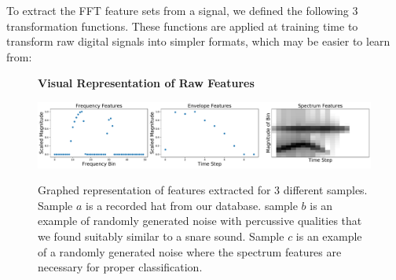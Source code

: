 \documentclass[\main/thesis.tex]{subfiles}
\begin{document}
To extract the FFT feature sets from a signal, we defined the following 3 transformation functions. These functions are applied at training time to transform raw digital signals into simpler formats, which may be easier to learn from: 
\begin{figure}
\centering
\textbf{Visual Representation of Raw Features}\par\medskip
    { \includegraphics[width=1\columnwidth]{images/ff3.pdf}}
\caption{Graphed representation of features extracted for 3 different samples. Sample $a$ is a recorded hat from our database. sample $b$ is an example of randomly generated noise with percussive qualities that we found suitably similar to a snare sound. Sample $c$ is an example of a randomly generated noise where the spectrum features are necessary for proper classification.}
\label{fig:stackspectrums}
\end{figure}
\end{document}
